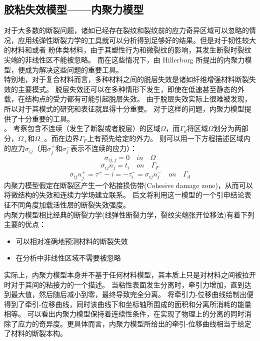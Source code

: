 \subsection{胶粘失效模型——内聚力模型}
对于大多数的断裂问题，诸如已经存在裂纹和裂纹前的应力奇异区域可以忽略的情况，应用线弹性断裂力学的工具就可以分析得到足够好的结果。但是对于韧性较大的材料和或者
粉体类材料，由于其塑性行为和微裂纹的影响，其发生断裂时裂纹尖端的非线性区不能被忽略。 而在这些情况下，由 Hillerborg 所提出的内聚力模型\cite{Hillerborg2008Analysis}，便成为解决这些问题的重要工具。\\
\indent 特别地，对于复合材料而言，多种材料之间的脱层失效是诸如纤维增强材料断裂失效的主要模式。 脱层失效还可以在多种情形下发生，即使在低速甚至静态的外载，在结构点的受力都有可能引起脱层失效\cite{Elices2002The}。 由于脱层失效实际上很难被发现，所以对于其模式的研究和表征就显得十分重要。 对于这样的问题，内聚力模型提供了十分重要的工具。\\
。 考察包含不连续（发生了断裂或者脱层）的区域$\Omega$，而$\Gamma_d$将区域$\Omega$划分为两部分，$\Omega_{+}$和$\Omega_{-}$。而在边界$\Gamma_{F}$上有预先给定的外力。 则可以用一下方程描述区域内的应力$\sigma_{ij}$（用$\sigma^{+}_j$和$\sigma^{-}_j$表示不连续的应力）\cite{Turon2007An}：
\begin{equation}
\sigma_{ij,j} = 0 \quad in \quad \Omega
\end{equation}
\begin{equation}
\sigma_{ij}n_j = t_i  \quad on \quad \Gamma_F
\end{equation}
\begin{equation}
\sigma_{ij} n^{+}_j = \tau^{+}-i = -\tau^{-}_i = \sigma_{ij}n^{-}_j \quad on \quad \Gamma_d
\end{equation}
\indent 内聚力模型假定在断裂区产生一个粘接损伤带(Cohesive damage zone)，从而可以将微结构的失效和连续力学场建立联系。 后文将利用这一模型的一个引申结论表征不同角度加载活性层的断裂失效强度。 \\
\indent 内聚力模型相比经典的断裂力学(线弹性断裂力学，裂纹尖端张开位移法)有着下列主要的优点：
\begin{itemize}
	\item 可以相对准确地预测材料的断裂失效
	\item 在分析中非线性区域不需要被忽略
\end{itemize}
实际上，内聚力模型本身并不基于任何材料模型，其本质上只是对材料之间被拉开时对于其间的粘接力的一个描述。 当粘性表面发生分离时，牵引力增加，直到达到最大值，然后随后减小到零，最终导致完全分离。 将牵引力-位移曲线绘制出便得到了牵引-位移曲线，同时该曲线下和坐标轴所围成的面积和分离所消耗的能量相等。 可以看出内聚力模型保持着连续性条件，在实现了物理上的分离的同时消除了应力的奇异度。更具体而言，内聚力模型所给出的牵引-位移曲线相当于给定了材料的断裂本构。\\
